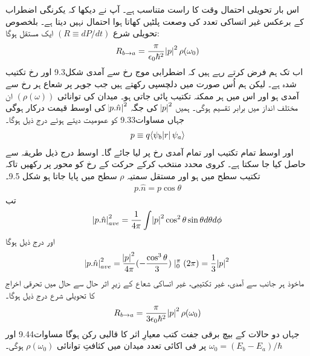 اس بار تحویلی احتمال وقت  کا راست متناسب ہے۔ آپ نے دیکھا کہ یکرنگی اضطراب کے برعکس غیر اتساکی تعدد کی وصعت پلٹیں کھاتا ہوا احتمال نہیں دیتا ہے۔ بلخصوص تحویلی شرع \((R\equiv dP/dt)\) ایک مستقل ہوگا:
\begin{align}
	R_{b\rightarrow a} = \frac{\pi}{\epsilon_0\hbar^2}\abs{p}^2\rho(\omega_0)
\end{align}
اب تک ہم فرض کرتے رہے ہیں کہ اضطرابی موج  رخ سے آمدی شکل\num{9.3} اور  رخ تکتیب شدہ ہے۔ لیکن ہم اُس صورت میں دلچسپی رکھتے ہیں جب جوہر پر شعاع ہر رخ سے آمدی ہو اور اس میں ہر ممکنہ تکتیب پائی جاتی ہو۔ میدان کی توانائی \((\rho(\omega))\) ان مختلف انداز میں برابر تقسیم ہوگی۔ ہمیں \(\abs{p}^2\) کی جگہ \(\abs{p.\hat{n}}^2\) کی اوسط قیمت درکار ہوگی جہاں مساوات\num{9.33} کو عمومیت دیتے ہوئے درج ذیل ہوگا۔ 
\begin{align}
	p \equiv q \langle \psi_b\abs{r}\psi_a \rangle
\end{align}
اور اوسط تمام تکتیب اور تمام آمدی رخ پر لیا جائے گا۔ اوسط درج ذیل طریقہ سے حاصل کیا جا سکتا ہے۔ کروی محدد منتخب کرکے حرکت کے رخ کو  محور پر رکھیں تاکہ تکتیب  سطح میں ہو اور مستقل سمتیہ \(\rho\) سطح  میں پایا جاتا ہو شکل 9.5۔
\begin{align}
	p.\hat{n} = p\cos\theta
\end{align}  
تب 
\begin{align*}
	\abs{p.\hat{n}}^2_{ave} = \frac{1}{4\pi}\int\abs{p}^2\cos^2\theta\sin\theta d\theta d\phi
\end{align*}
اور درج ذیل ہوگا 
\begin{align}
	\abs{p.\hat{n}}^2_{ave} = \frac{\abs{p}^2}{4\pi}(-\frac{\cos^3\theta}{3})\mid^\pi_{0}(2\pi) = \frac{1}{3}\abs{p}^2
\end{align}
ماخوذ ہر جانب سے آمدی، غیر تکتیبی، غیر اتساکی شعاع کے زیرِ اثر حال  سے حال  میں تحرقی اخراج کا تحویلی شرع درج ذیل ہوگا۔
\begin{align}
	R_{b\rightarrow a} = \frac{\pi}{3\epsilon_0\hbar^2}\abs{p}^2\rho(\omega_0)
\end{align}
جہاں دو حالات کے بیچ برقی جفت کتب معیارِ اثر کا قالبی رکن  ہوگا مساوات\num{9.44} اور \(\omega_0 = (E_b-E_a)/\hbar\) پر فی اکائی تعدد میدان میں کثافتِ توانائی \(\rho(\omega_0)\) ہوگی۔


